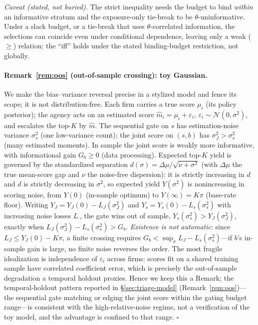 \noindent\emph{Caveat (stated, not buried).} The strict inequality
needs the budget to bind \emph{within} an informative stratum and
the exposure-only tie-break to be $\theta$-uninformative. Under a
slack budget, or a tie-break that uses $\theta$-correlated
information, the selections can coincide even under conditional
dependence, leaving only a weak ($\ge$) relation; the ``iff''
holds under the stated binding-budget restriction, not globally.

\paragraph{Remark~\ref{rem:oos} (out-of-sample crossing): toy Gaussian.}
We make the bias--variance reversal precise in a stylized model and
fence its scope; it is not distribution-free. Each firm carries a
true score $\mu_i$ (its policy posterior); the agency acts on an
estimated score $\widehat m_i=\mu_i+\varepsilon_i$,
$\varepsilon_i\sim\mathcal N(0,\sigma^2)$, and escalates the
top-$K$ by $\widehat m$. The sequential gate on $s$ has
estimation-noise variance $\sigma_s^2$ (one low-variance count);
the joint score on $(s,b)$ has $\sigma_J^2>\sigma_s^2$ (many
estimated moments). In sample the joint score is weakly more
informative, with informational gain $G_b\ge0$ (data processing).
Expected top-$K$ yield is governed by the standardized separation
$d(\sigma)=\Delta\mu/\sqrt{\nu+\sigma^2}$ (with $\Delta\mu$ the
true mean-score gap and $\nu$ the noise-free dispersion): it is
strictly increasing in $d$ and $d$ is strictly decreasing in
$\sigma^2$, so expected yield $Y(\sigma^2)$ is nonincreasing in
scoring noise, from $Y(0)$ (in-sample optimum) to $Y(\infty)=K\pi$
(base-rate floor). Writing $Y_J=Y_J(0)-L_J(\sigma_J^2)$ and
$Y_s=Y_s(0)-L_s(\sigma_s^2)$ with increasing noise losses
$L_\cdot$, the gate wins out of sample,
$Y_s(\sigma_s^2)>Y_J(\sigma_J^2)$, exactly when
$L_J(\sigma_J^2)-L_s(\sigma_s^2)>G_b$. \emph{Existence is not
automatic}: since $L_J\le Y_J(0)-K\pi$, a finite crossing requires
$G_b<\sup_\sigma L_J-L_s(\sigma_s^2)$---if $b$'s in-sample gain is
large, no finite noise reverses the order. The most fragile
idealization is independence of $\varepsilon_i$ across firms:
scores fit on a shared training sample have correlated coefficient
error, which is precisely the out-of-sample degradation a temporal
holdout proxies. Hence we keep this a Remark; the temporal-holdout pattern
reported in \S\ref{sec:triage-model} (Remark~\ref{rem:oos})---the
sequential gate matching or edging the joint score within the
gating budget range---is consistent with the high-relative-noise
regime, not a verification of the toy model, and the advantage is
confined to that range.
\hfill$\square$

